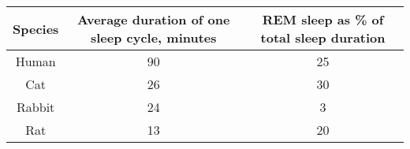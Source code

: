 \documentclass{article}
\begin{document}
\begin{tabular}{ |c|c|c| }
\hline
Species & Average duration of one sleep cycle, minutes & REM sleep as \% of total sleep duration \\
\hline
Human & 90 & 25 \\
\hline
Cat & 26 & 30 \\
\hline
Rabbit & 24 & 3 \\
\hline
Rat & 13 & 20 \\
\hline
\end{tabular}
\end{document}
